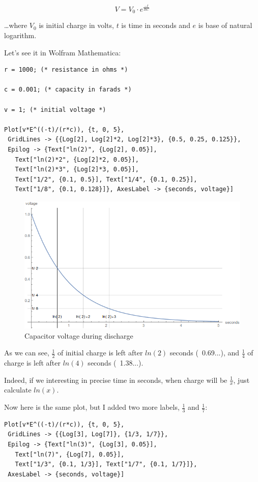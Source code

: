 \LARGE\[
V=V_0 \cdot e^{\frac{-t}{RC}}
\]
\normalsize

\dots where $V_0$ is initial charge in volts, $t$ is time in seconds and $e$ is base of natural logarithm.

Let's see it in Wolfram Mathematica:

\begin{lstlisting}[caption=Wolfram Mathematica]
r = 1000; (* resistance in ohms *)

c = 0.001; (* capacity in farads *)

v = 1; (* initial voltage *)

Plot[v*E^((-t)/(r*c)), {t, 0, 5}, 
 GridLines -> {{Log[2], Log[2]*2, Log[2]*3}, {0.5, 0.25, 0.125}},
 Epilog -> {Text["ln(2)", {Log[2], 0.05}], 
   Text["ln(2)*2", {Log[2]*2, 0.05}], 
   Text["ln(2)*3", {Log[2]*3, 0.05}],
   Text["1/2", {0.1, 0.5}], Text["1/4", {0.1, 0.25}], 
   Text["1/8", {0.1, 0.128}]}, AxesLabel -> {seconds, voltage}]
\end{lstlisting}

\begin{figure}[H]
\centering
\includegraphics[scale=0.66]{log/capacitor_discharge.png}
\caption{Capacitor voltage during discharge}
\end{figure}

As we can see, $\frac{1}{2}$ of initial charge is left after $ln(2)$ seconds (~0.69...), 
and $\frac{1}{4}$ of charge is left after $ln(4)$ seconds (~1.38...).

Indeed, if we interesting in precise time in seconds, when charge will be $\frac{1}{x}$, just calculate $ln(x)$.

Now here is the same plot, but I added two more labels, $\frac{1}{3}$ and $\frac{1}{7}$:

\begin{lstlisting}[caption=Wolfram Mathematica]
Plot[v*E^((-t)/(r*c)), {t, 0, 5}, 
 GridLines -> {{Log[3], Log[7]}, {1/3, 1/7}},
 Epilog -> {Text["ln(3)", {Log[3], 0.05}], 
   Text["ln(7)", {Log[7], 0.05}],
   Text["1/3", {0.1, 1/3}], Text["1/7", {0.1, 1/7}]}, 
 AxesLabel -> {seconds, voltage}]
\end{lstlisting}

